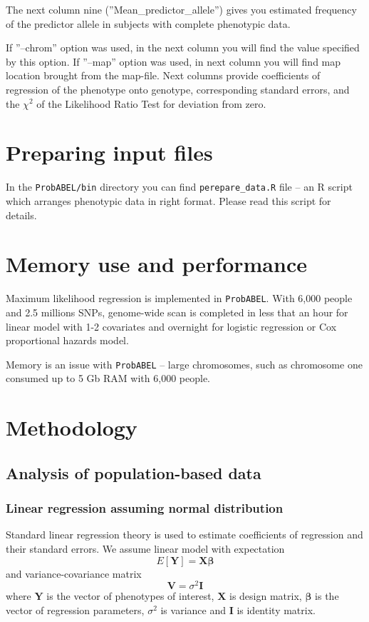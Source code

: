 \documentclass[12pt]{article}
\begin{document}
The next column nine (''Mean\_predictor\_allele'') gives you estimated 
frequency of the predictor allele in subjects with complete phenotypic data. 

If ''--chrom'' option was used, in the next column you will find the 
value specified by this option. If ''--map'' option was used, in next 
column you will find map location brought from the map-file. Next 
columns provide coefficients of regression  of the phenotype 
onto genotype, corresponding standard errors, and the $\chi^2$ 
of the Likelihood Ratio Test for deviation from zero.

\section{Preparing input files}

In the \texttt{ProbABEL/bin} directory you can find \texttt{perepare\_data.R}
file -- an R script which arranges phenotypic data in right format. 
Please read this script for details.

\section{Memory use and performance}

Maximum likelihood regression is implemented in \texttt{ProbABEL}. With 6,000 
people and 2.5 millions SNPs, genome-wide scan is completed in less 
that an hour for linear model with 1-2 covariates and overnight 
for logistic regression or Cox proportional hazards model.

Memory is an issue with \texttt{ProbABEL} -- large chromosomes, 
such as chromosome one consumed up to 5 Gb RAM with 6,000 people. 

\section{Methodology}

\subsection{Analysis of population-based data}

\subsubsection{Linear regression assuming normal distribution}

Standard linear regression theory is used to estimate coefficients of
regression and their standard errors. We assume linear model with
expectation
\begin{equation}
E[\mathbf{Y}] = \mathbf{X} \mathbf{\beta}
\label{expectation}
\end{equation}
and variance-covariance matrix 
$$
\mathbf{V} = \sigma^2 \mathbf{I}
$$
where $\mathbf{Y}$ is the vector of phenotypes of interest, 
$\mathbf{X}$ is design matrix, $\mathbf{\beta}$ is the vector of regression 
parameters, $\sigma^2$ is variance and $\mathbf{I}$ is identity matrix. 
\end{document}
